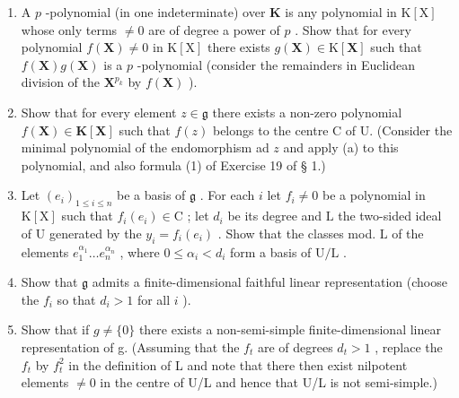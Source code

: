 \begin{enumerate}
\def\labelenumi{(\alph{enumi})}
\item
  A \(p\) -polynomial (in one indeterminate) over \(\mathbf{K}\) is any polynomial in \(\mathrm{K}[\mathrm{X}]\) whose only terms \(\neq 0\) are of degree a power of \(p\) . Show that for every polynomial \(f(\mathbf{X}) \neq 0\) in \(\mathrm{K}[\mathrm{X}]\) there exists \(g(\mathbf{X}) \in \mathrm{K}[\mathbf{X}]\) such that \(f(\mathbf{X})g(\mathbf{X})\) is a \(p\) -polynomial (consider the remainders in Euclidean division of the \(\mathbf{X}^{p_k}\) by \(f(\mathbf{X})\) ).
\item
  Show that for every element \(z \in \mathfrak{g}\) there exists a non-zero polynomial \(f(\mathbf{X}) \in \mathbf{K}[\mathbf{X}]\) such that \(f(z)\) belongs to the centre C of U. (Consider the minimal polynomial of the endomorphism ad \(z\) and apply (a) to this polynomial, and also formula (1) of Exercise 19 of § 1.)
\item
  Let \((e_i)_{1\leqslant i\leqslant n}\) be a basis of \(\mathfrak{g}\) . For each \(i\) let \(f_{i}\neq 0\) be a polynomial in \(\mathrm{K}[\mathrm{X}]\) such that \(f_{i}(e_{i})\in \mathrm{C}\) ; let \(d_{i}\) be its degree and \(\mathrm{L}\) the two-sided ideal of \(\mathrm{U}\) generated by the \(y_{i} = f_{i}(e_{i})\) . Show that the classes mod. \(\mathrm{L}\) of the elements \(e_1^{\alpha_1}\ldots e_n^{\alpha_n}\) , where \(0\leqslant \alpha_{i} < d_{i}\) form a basis of \(\mathrm{U / L}\) .
\item
  Show that \(\mathfrak{g}\) admits a finite-dimensional faithful linear representation (choose the \(f_{i}\) so that \(d_{i} > 1\) for all \(i\) ).
\item
  Show that if \(g \neq \{0\}\) there exists a non-semi-simple finite-dimensional linear representation of g. (Assuming that the \(f_{t}\) are of degrees \(d_{t} > 1\) , replace the \(f_{t}\) by \(f_{t}^{2}\) in the definition of L and note that there then exist nilpotent elements \(\neq 0\) in the centre of U/L and hence that U/L is not semi-simple.)
\end{enumerate}


